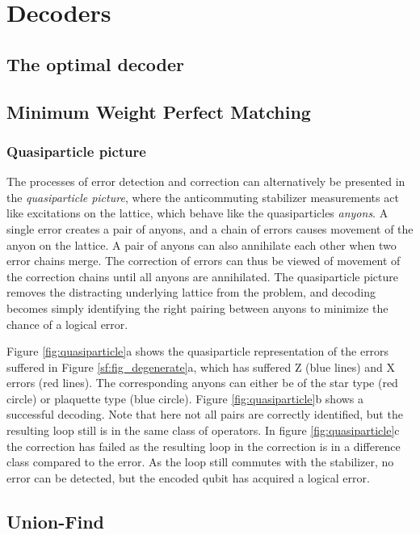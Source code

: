 \chapter{Decoders}\label{sec:surface_decoders}
\section{The optimal decoder}\label{sec:optimal_decoder}
\section{Minimum Weight Perfect Matching}\label{sec:MWPMdecoder}

\subsection{Quasiparticle picture}
The processes of error detection and correction can alternatively be presented in the \emph{quasiparticle picture}, where the anticommuting stabilizer measurements act like excitations on the lattice, which behave like the quasiparticles \emph{anyons}. A single error creates a pair of anyons, and a chain of errors causes movement of the anyon on the lattice. A pair of anyons can also annihilate each other when two error chains merge. The correction of errors can thus be viewed of movement of the correction chains until all anyons are annihilated. The quasiparticle picture removes the distracting underlying lattice from the problem, and decoding becomes simply identifying the right pairing between anyons to minimize the chance of a logical error.

Figure \ref{fig:quasiparticle}a shows the quasiparticle representation of the errors suffered in Figure \ref{sf:fig_degenerate}a, which has suffered Z (blue lines) and X errors (red lines). The corresponding anyons can either be of the star type (red circle) or plaquette type (blue circle). Figure \ref{fig:quasiparticle}b shows a successful decoding. Note that here not all pairs are correctly identified, but the resulting loop still is in the same class of operators. In figure \ref{fig:quasiparticle}c the correction has failed as the resulting loop in the correction is in a difference class compared to the error. As the loop still commutes with the stabilizer, no error can be detected, but the encoded qubit has acquired a logical error.


\section{Union-Find}\label{sec:UFdecoder}


